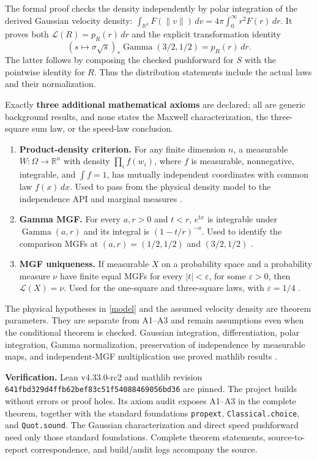 \documentclass[11pt,letterpaper]{article}
\newcommand{\R}{\mathbb R}
\newcommand{\Law}{\mathcal L}
\newcommand{\heading}[1]{\par\medskip{\large\bfseries\color{navy}#1}\par\smallskip}
\begin{document}
The formal proof checks the density independently by polar integration of the derived Gaussian velocity density:
$\int_{\R^3}F(\|v\|)\,dv=4\pi\int_0^\infty r^2F(r)\,dr$.
It proves both $\Law(R)=p_R(r)\,dr$ and the explicit transformation identity
\[
  (s\mapsto\sigma\sqrt s)_*\operatorname{Gamma}(3/2,1/2)=p_R(r)\,dr.
\]
The latter follows by composing the checked pushforward for $S$ with the pointwise identity for $R$. Thus the distribution statements include the actual laws and their normalization.
\newpage

\heading{5. External inputs, verification, and scope}
Exactly \textbf{three additional mathematical axioms} are declared; all are generic background results, and none states the Maxwell characterization, the three-square sum law, or the speed-law conclusion.
\begin{enumerate}[label=\textbf{A\arabic*.}]
\item \textbf{Product-density criterion.} For any finite dimension $n$, a measurable $W:\Omega\to\R^n$ with density $\prod_i f(w_i)$, where $f$ is measurable, nonnegative, integrable, and $\int f=1$, has mutually independent coordinates with common law $f(x)\,dx$. Used to pass from the physical density model to the independence API and marginal measures \cite[independence between continuous variables; mutual independence]{indep}.
\item \textbf{Gamma MGF.} For every $a,r>0$ and $t<r$, $e^{tx}$ is integrable under $\operatorname{Gamma}(a,r)$ and its integral is $(1-t/r)^{-a}$. Used to identify the comparison MGFs at $(a,r)=(1/2,1/2)$ and $(3/2,1/2)$ \cite[general Gamma distribution, Moments]{gamma}.
\item \textbf{MGF uniqueness.} If measurable $X$ on a probability space and a probability measure $\nu$ have finite equal MGFs for every $|t|<\varepsilon$, for some $\varepsilon>0$, then $\Law(X)=\nu$. Used for the one-square and three-square laws, with $\varepsilon=1/4$ \cite[characterization of a distribution via the MGF]{mgf}.
\end{enumerate}
The physical hypotheses in \eqref{model} and the assumed velocity density are theorem parameters. They are separate from A1--A3 and remain assumptions even when the conditional theorem is checked. Gaussian integration, differentiation, polar integration, Gamma normalization, preservation of independence by measurable maps, and independent-MGF multiplication use proved mathlib results \cite{mathlib}.

\textbf{Verification.} Lean v4.33.0-rc2 and mathlib revision
\texttt{641fbd329d4ffb62bef83c51f54088469056bd36} are pinned.
The project builds without errors or proof holes. Its axiom audit exposes A1--A3 in the complete theorem, together with the standard foundations \texttt{propext}, \texttt{Classical.choice}, and \texttt{Quot.sound}. The Gaussian characterization and direct speed pushforward need only those standard foundations. Complete theorem statements, source-to-report correspondence, and build/audit logs accompany the source.
\end{document}
